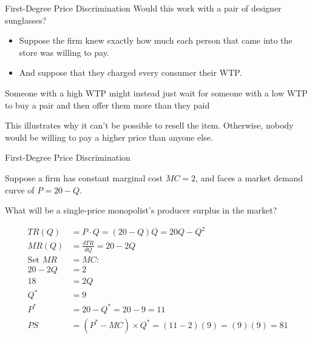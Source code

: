\documentclass{beamer}
\begin{document}
\begin{frame}{First-Degree Price Discrimination}
  Would this work with a pair of designer sunglasses?

  \begin{itemize}
    \item Suppose the firm knew exactly how much each person that came into the store was willing to pay.
    
    \item And suppose that they charged every consumer their WTP.
  \end{itemize}
  
  \bigskip
  Someone with a high WTP might instead just wait for someone with a low WTP to buy a pair and then offer them more than they paid

  \bigskip
  This illustrates why it can't be possible to resell the item. Otherwise, nobody would be willing to pay a higher price than anyone else.
\end{frame}

\begin{frame}{First-Degree Price Discrimination}


  Suppose a firm has constant marginal cost $MC = 2$, and faces a market demand curve of $P = 20 - Q$.

  \bigskip
  What will be a single-price monopolist's producer surplus in the market?
\end{frame}

\begin{frame}

\[
\begin{aligned}
TR(Q) &= P \cdot Q = (20-Q)Q = 20Q - Q^2\\[0.5ex]
MR(Q) &= \frac{dTR}{dQ} = 20-2Q\\[1ex]
\text{Set } MR&=MC:\\
20-2Q &= 2\\
18 &= 2Q\\
Q^* &= 9\\[1ex]
P^* &= 20-Q^* = 20-9 = 11\\[1ex]
PS &= (P^*-MC)\times Q^* = (11-2)(9) = (9)(9) = 81
\end{aligned}
\]

\begin{center}
\end{center}
\end{frame}
\end{document}
